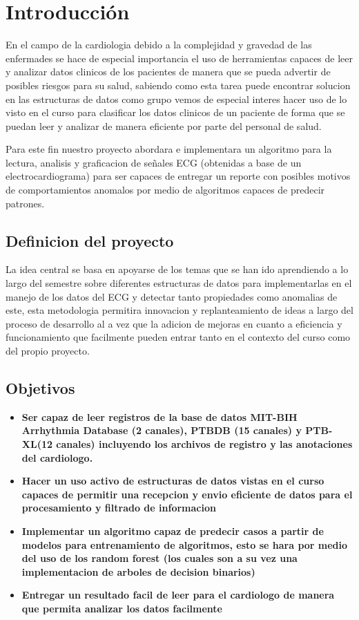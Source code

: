 \section{Introducción}

En el campo de la cardiologia debido a la complejidad y gravedad de las enfermades se hace de especial importancia el uso de herramientas capaces de leer y analizar datos clinicos de los pacientes de manera que se pueda advertir de posibles riesgos para su salud, sabiendo como esta tarea puede encontrar solucion en las estructuras de datos como grupo vemos de especial interes hacer uso de lo visto en el curso
para clasificar los datos clinicos de un paciente de forma que se puedan leer y analizar de manera eficiente por parte del personal de salud.

Para este fin nuestro proyecto abordara e implementara un algoritmo para la lectura, analisis y graficacion de señales ECG (obtenidas a base de un electrocardiograma) para ser capaces de entregar un reporte con posibles motivos de comportamientos anomalos por medio de algoritmos capaces de predecir patrones.

\subsection{Definicion del proyecto}
La idea central se basa en apoyarse de los temas que se han ido aprendiendo a lo largo del semestre sobre diferentes estructuras de datos para implementarlas en el manejo de los datos del ECG y detectar tanto propiedades como anomalias de este, esta metodologia permitira innovacion y replanteamiento de ideas a largo del proceso de desarrollo al a vez que la adicion de mejoras en cuanto a eficiencia y funcionamiento que facilmente pueden entrar tanto en el contexto del curso como del propio proyecto. 


\subsection{Objetivos}

\begin{itemize}
    \item \textbf{Ser capaz de leer registros de la base de datos MIT-BIH Arrhythmia Database (2 canales), PTBDB (15 canales) y PTB-XL(12 canales) incluyendo los archivos de registro y las anotaciones del cardiologo.} \cite{MIT-BIH} \cite{PhysioNet}
    \item \textbf{Hacer un uso activo de estructuras de datos vistas en el curso capaces de permitir una recepcion y envio eficiente de datos para el procesamiento y filtrado de informacion}
    \item \textbf{Implementar un algoritmo capaz de predecir casos a partir de modelos para entrenamiento de algoritmos, esto se hara por medio del uso de los random forest (los cuales son a su vez una implementacion de arboles de decision binarios)}
    \item \textbf{Entregar un resultado facil de leer para el cardiologo de manera que permita analizar los datos facilmente} 
\end{itemize}